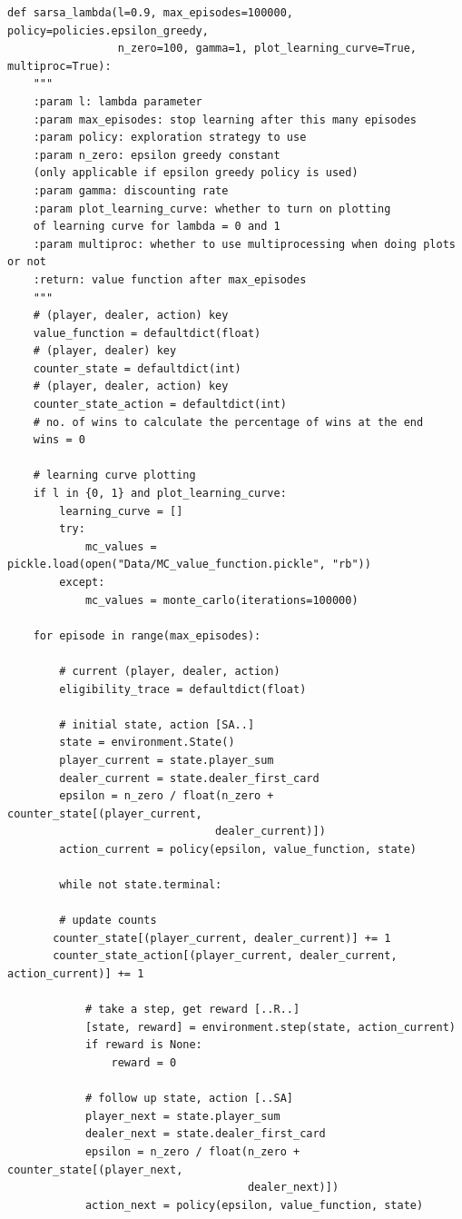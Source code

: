 \documentclass[11pt]{article}
\theoremstyle{plain}
\theoremstyle{definition}
\begin{document}
\begin{lstlisting}
def sarsa_lambda(l=0.9, max_episodes=100000, policy=policies.epsilon_greedy,
                 n_zero=100, gamma=1, plot_learning_curve=True, multiproc=True):
    """
    :param l: lambda parameter
    :param max_episodes: stop learning after this many episodes
    :param policy: exploration strategy to use
    :param n_zero: epsilon greedy constant
    (only applicable if epsilon greedy policy is used)
    :param gamma: discounting rate
    :param plot_learning_curve: whether to turn on plotting 
    of learning curve for lambda = 0 and 1
    :param multiproc: whether to use multiprocessing when doing plots or not
    :return: value function after max_episodes
    """
    # (player, dealer, action) key
    value_function = defaultdict(float)
    # (player, dealer) key
    counter_state = defaultdict(int)
    # (player, dealer, action) key
    counter_state_action = defaultdict(int)
    # no. of wins to calculate the percentage of wins at the end
    wins = 0

    # learning curve plotting
    if l in {0, 1} and plot_learning_curve:
        learning_curve = []
        try:
            mc_values = pickle.load(open("Data/MC_value_function.pickle", "rb"))
        except:
            mc_values = monte_carlo(iterations=100000)

    for episode in range(max_episodes):

        # current (player, dealer, action)
        eligibility_trace = defaultdict(float)

        # initial state, action [SA..]
        state = environment.State()
        player_current = state.player_sum
        dealer_current = state.dealer_first_card
        epsilon = n_zero / float(n_zero + counter_state[(player_current,
         						dealer_current)])
        action_current = policy(epsilon, value_function, state)

        while not state.terminal:

        # update counts
       counter_state[(player_current, dealer_current)] += 1
       counter_state_action[(player_current, dealer_current, action_current)] += 1

            # take a step, get reward [..R..]
            [state, reward] = environment.step(state, action_current)
            if reward is None:
                reward = 0

            # follow up state, action [..SA]
            player_next = state.player_sum
            dealer_next = state.dealer_first_card
            epsilon = n_zero / float(n_zero + counter_state[(player_next,
            						 dealer_next)])
            action_next = policy(epsilon, value_function, state)


\end{lstlisting}
\end{document}
